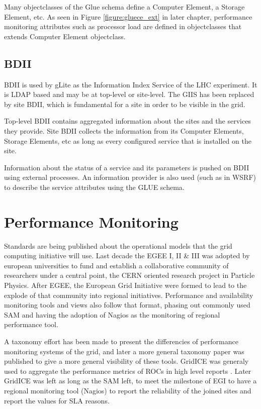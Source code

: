 Many objectclasses of the Glue schema define a Computer Element, a Storage
Element, etc. As seen in Figure \ref{figure:gluece_ext} in later chapter,
performance monitoring attributes such as processor load are defined in
objectclasses that extends Computer Element objectclass.

\subsection{BDII}\label{subsec:bdii}
BDII is used by gLite as the Information Index Service of the LHC experiment. It
is LDAP based and may be at top-level or site-level. The GIIS has been replaced
by site BDII, which is fundamental for a site in order to be visible in the
grid.

Top-level BDII contains aggregated information about the sites and the services
they provide. Site BDII collects the information from its Computer Elements,
Storage Elements, etc as long as every configured service that is installed
on the site.

Information about the status of a service and its parameters is pushed on BDII
using external processes. An information provider is also used (such as in WSRF)
to describe the service attributes using the GLUE schema.

\section{Performance Monitoring}
Standards are being published about the operational models that the grid
computing initiative will use. Last decade the EGEE I, II \& III was adopted by
european universities to fund and establish a collaborative community of
researchers under a central point, the CERN oriented research project in
Particle Physics. After EGEE, the European Grid Initiative were formed to lead
to the explode of that community into regional initiatives. Performance
and availability monitoring tools and views also follow that format, phasing out
commonly used SAM \cite{egee3dsa122} and having the adoption of Nagios as the
monitoring of regional performance tool.


A taxonomy effort has been made \cite{gerndt2004performance} to present the
differencies of performance monitoring systems of the grid, and later a more
general \cite{zanikolas2007importance} taxonomy paper was published to give a
more general visibility of these tools. GridICE was generaly used to aggregate
the performance metrics of ROCs in high level reports
\cite{andreozzi2005gridice}. Later GridICE was left as long as the SAM left, to
meet the milestone of EGI to have a regional monitoring tool (Nagios) to report
the reliability of the joined sites and report the values for SLA reasons.

